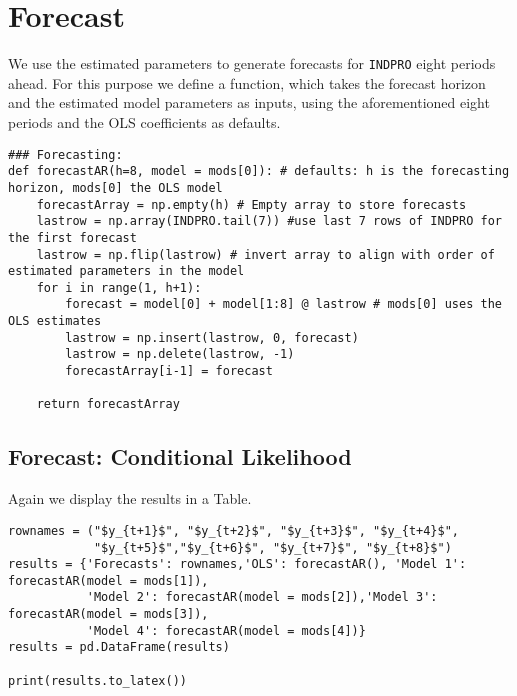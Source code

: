 \documentclass{article}
\begin{document}
\section{Forecast}
We use the estimated parameters to generate forecasts for \texttt{INDPRO} eight periods ahead.
For this purpose we define a function, which takes the forecast horizon and the estimated model parameters as inputs, using the aforementioned eight periods and the OLS coefficients as defaults.

\begin{verbatim}
### Forecasting:
def forecastAR(h=8, model = mods[0]): # defaults: h is the forecasting horizon, mods[0] the OLS model
    forecastArray = np.empty(h) # Empty array to store forecasts
    lastrow = np.array(INDPRO.tail(7)) #use last 7 rows of INDPRO for the first forecast
    lastrow = np.flip(lastrow) # invert array to align with order of estimated parameters in the model
    for i in range(1, h+1):
        forecast = model[0] + model[1:8] @ lastrow # mods[0] uses the OLS estimates
        lastrow = np.insert(lastrow, 0, forecast)
        lastrow = np.delete(lastrow, -1)
        forecastArray[i-1] = forecast

    return forecastArray
\end{verbatim}
\subsection{Forecast: Conditional Likelihood}
Again we display the results in a Table.
\begin{verbatim}
rownames = ("$y_{t+1}$", "$y_{t+2}$", "$y_{t+3}$", "$y_{t+4}$",
            "$y_{t+5}$","$y_{t+6}$", "$y_{t+7}$", "$y_{t+8}$")
results = {'Forecasts': rownames,'OLS': forecastAR(), 'Model 1': forecastAR(model = mods[1]),
           'Model 2': forecastAR(model = mods[2]),'Model 3': forecastAR(model = mods[3]),
           'Model 4': forecastAR(model = mods[4])}
results = pd.DataFrame(results)

print(results.to_latex())
\end{verbatim}
\end{document}

